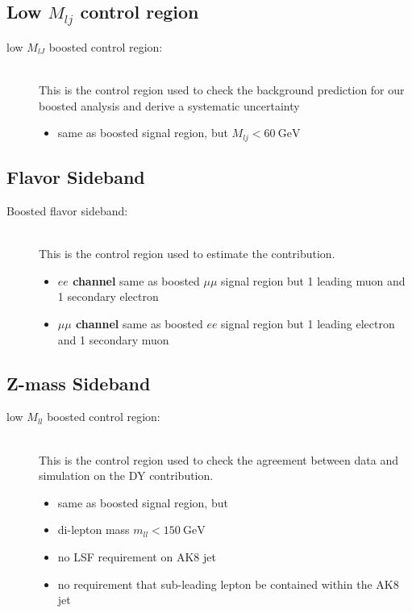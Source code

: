 \subsection{Low $M_{lj}$ control region}

\begin{description}
\item[low $M_{lJ}$ boosted control region:]\ \\This is the control region used to check the \ttbar background prediction for our boosted analysis and derive a systematic uncertainty
  \begin{itemize}
  \item same as boosted signal region, but $M_{l j} < \SI{60}{\GeV}$
  \end{itemize}
\end{description}

\subsection{Flavor Sideband}

\begin{description}
\item[Boosted flavor sideband:]\ \\  This is the control region used to estimate the \ttbar contribution.
  \begin{itemize}
  \item \textbf{$ee$ channel} same as boosted $\mu\mu$ signal region but 1 leading muon and 1 secondary electron
  \item \textbf{$\mu\mu$ channel} same as boosted $ee$ signal region but 1 leading electron and 1 secondary muon
  \end{itemize}
\end{description}

\subsection{Z-mass Sideband}

\begin{description}
\item[low $M_{ll}$ boosted control region:]\ \\ This is the control region used to check the agreement between data and simulation on the DY contribution.
  \begin{itemize}
  \item same as boosted signal region, but
  \item di-lepton mass $m_{ll} < \SI{150}{\GeV}$
  \item no LSF requirement on AK8 jet
  \item no requirement that sub-leading lepton be contained within the AK8 jet
  \end{itemize}
\end{description}

